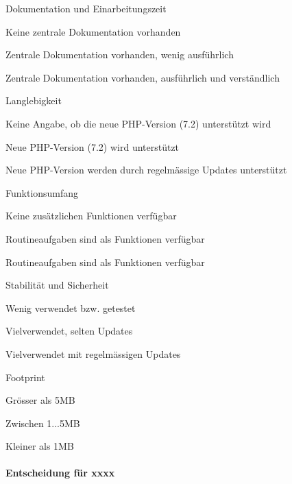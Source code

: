 \begin{itemize*}
\item Dokumentation und Einarbeitungszeit
  \begin{enumerate*}
  \item Keine zentrale Dokumentation vorhanden
  \item Zentrale Dokumentation vorhanden, wenig ausführlich
  \item Zentrale Dokumentation vorhanden, ausführlich und verständlich
  \end{enumerate*}
\item Langlebigkeit
  \begin{enumerate*}
  \item Keine Angabe, ob die neue PHP-Version (7.2) unterstützt wird
  \item Neue PHP-Version (7.2) wird unterstützt
  \item Neue PHP-Version werden durch regelmässige Updates unterstützt
  \end{enumerate*}
\item Funktionsumfang
  \begin{enumerate*}
  \item Keine zusätzlichen Funktionen verfügbar
  \item Routineaufgaben sind als Funktionen verfügbar
  \item Routineaufgaben sind als Funktionen verfügbar
  \end{enumerate*}
\item Stabilität und Sicherheit
  \begin{enumerate*}
  \item Wenig verwendet bzw. getestet
  \item Vielverwendet, selten Updates
  \item Vielverwendet mit regelmässigen Updates
  \end{enumerate*}
\item Footprint
  \begin{enumerate*}
  \item Grösser als 5MB
  \item Zwischen 1...5MB
  \item Kleiner als 1MB
  \end{enumerate*}
\end{itemize*}


\paragraph*{Entscheidung für xxxx}



